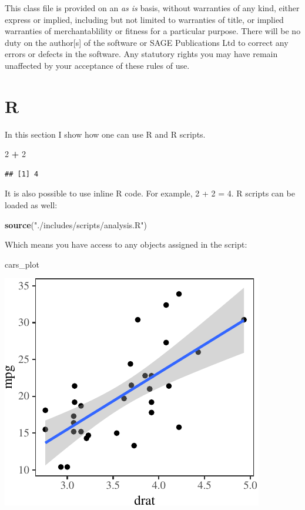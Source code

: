 \documentclass[Afour,sageh,times]{includes/tex/sagej}
\newenvironment{Shaded}{\begin{snugshade}}{\end{snugshade}}
\newcommand{\DecValTok}[1]{\textcolor[rgb]{0.00,0.00,0.81}{#1}}
\newcommand{\KeywordTok}[1]{\textcolor[rgb]{0.13,0.29,0.53}{\textbf{#1}}}
\newcommand{\NormalTok}[1]{#1}
\newcommand{\OperatorTok}[1]{\textcolor[rgb]{0.81,0.36,0.00}{\textbf{#1}}}
\newcommand{\StringTok}[1]{\textcolor[rgb]{0.31,0.60,0.02}{#1}}
\begin{document}
This class file is provided on an \textit{as is} basis, without
warranties of any kind, either express or implied, including but not
limited to warranties of title, or implied warranties of
merchantablility or fitness for a particular purpose. There will be no
duty on the author{[}s{]} of the software or SAGE Publications Ltd to
correct any errors or defects in the software. Any statutory rights you
may have remain unaffected by your acceptance of these rules of use.

\section{R}

In this section I show how one can use R and R scripts.

\begin{Shaded}
\begin{Highlighting}[]
\DecValTok{2} \OperatorTok{+}\StringTok{ }\DecValTok{2}
\end{Highlighting}
\end{Shaded}

\begin{verbatim}
## [1] 4
\end{verbatim}

\noindent It is also possible to use inline R code. For example, 2 + 2 =
4. R scripts can be loaded as well:

\begin{Shaded}
\begin{Highlighting}[]
\KeywordTok{source}\NormalTok{(}\StringTok{"./includes/scripts/analysis.R"}\NormalTok{)}
\end{Highlighting}
\end{Shaded}

\noindent Which means you have access to any objects assigned in the
script:

\begin{Shaded}
\begin{Highlighting}[]
\NormalTok{cars_plot}
\end{Highlighting}
\end{Shaded}

\begin{flushleft}\includegraphics{./includes/figs/ex_plot-1} \end{flushleft}
\end{document}
